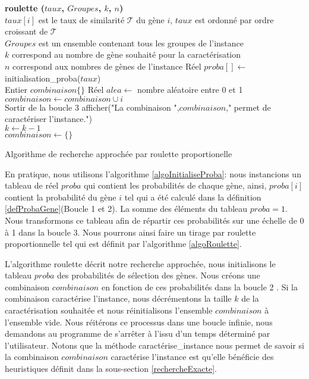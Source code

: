 \begin{algorithm}
	\textbf{ roulette ($taux$, $Groupes$, $k$, $n$)}\\
	\tcp
	{
		$taux[i]$ est le taux de similarité $\mathcal{T}$ du gène $i$, $taux$ est ordonné par ordre croissant de $\mathcal{T}$\\
		$Groupes$ est un ensemble contenant tous les groupes de l'instance\\
		$k$ correspond au nombre de gène souhaité pour la caractérisation\\
		$n$ correspond aux nombres de gènes de l'instance
	}
	Réel $proba[] \leftarrow$ initialisation\_proba($taux$)\\
	{
		Entier $combinaison\{\}$ 
		{
			Réel $alea \leftarrow $ nombre aléatoire entre 0 et 1 \\
			{
				{
					$combinaison \leftarrow combinaison \cup i$\\
					Sortir de la boucle 3
				}
			}
		}
		{
			afficher("La combinaison ",$combinaison$," permet de caractériser l'instance.")\\
			$k \leftarrow k-1$\\
			$combinaison \leftarrow \{\}$		
		}
	}
	\caption{Algorithme de recherche approchée par roulette proportionelle}
	\label{algoRoulette}
\end{algorithm}
		
En pratique, nous utilisons l'algorithme \ref{algoInitialiseProba}: nous instancions un tableau  de réel $proba$ qui contient les probabilités de chaque gène, ainsi, $proba[i]$ contient la probabilité du gène $i$ tel qui a été calculé dans la définition \ref{defProbaGene}(Boucle 1 et 2). La somme des éléments du tableau $proba = 1$. Nous transformons ce tableau afin de répartir ces probabilités sur une échelle de 0 à 1 dans la boucle 3. Nous pourrons ainsi faire un tirage par roulette proportionnelle tel qui est définit par l'algorithme \ref{algoRoulette}.

L'algorithme roulette décrit notre recherche approchée, nous initialisons le tableau $proba$ des probabilités de sélection des gènes. Nous créons une combinaison $combinaison$ en fonction de ces probabilités dans la boucle 2 . Si la combinaison caractérise l'instance, nous décrémentons la taille $k$ de la caractérisation souhaitée et nous réinitialisons l'ensemble $combinaison$ à l'ensemble vide. Nous réitérons ce processus dans une boucle infinie, nous demandons au programme de s'arrêter à l'issu d'un temps déterminé par l'utilisateur. Notons que la méthode caractérise\_instance nous permet de savoir si la combinaison $combinaison$ caractérise l'instance est qu'elle bénéficie des heuristiques définit dans la sous-section \ref{rechercheExacte}.

